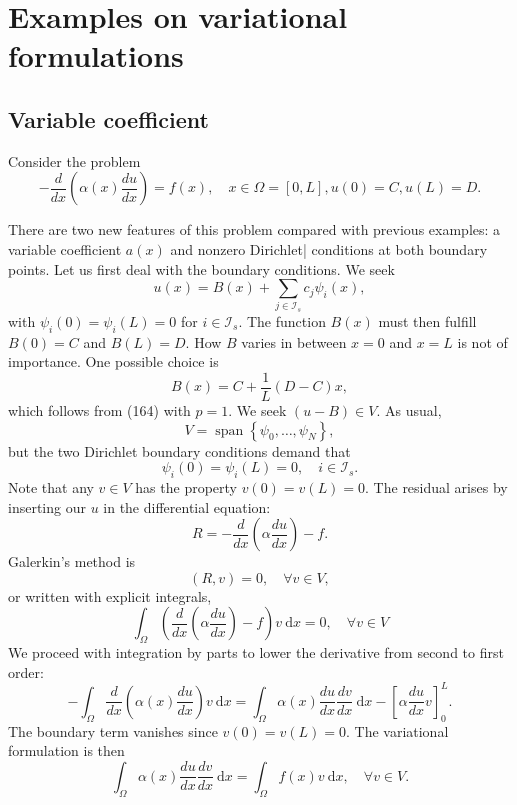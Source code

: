 \documentclass[../main.tex]{subfiles}
\begin{document}
\chapter{Examples on variational formulations}
\label{chap:chap_12}

\section[Variable coefficient]{Variable coefficient}
	\label{sec:sec_12_1}
		\noindent Consider the problem
		\begin{equation}
		\label{eqa166}
			-\frac{d}{d x}\left(\alpha(x) \frac{d u}{d x}\right)=f(x), \quad x \in \Omega=[0, L], u(0)=C, u(L)=D .
		\end{equation}
	
		\noindent There are two new features of this problem compared with previous examples: a variable coefficient $a(x)$ and nonzero Dirichlet| conditions at both boundary points.\smallbreak
		Let us first deal with the boundary conditions. We seek
		$$ u(x)=B(x)+\sum_{j \in \mathcal{I}_{s}} c_{j} \psi_{i}(x), $$
		with $\psi_{i}(0)=\psi_{i}(L)=0$ for $i \in \mathcal{I}_{s}$. The function $B(x)$ must then fulfill $B(0)=C$ and $B(L)=D$. How $B$ varies in between $x=0$ and $x=L$ is not of importance.\smallbreak
		\noindent One possible choice is
		$$ B(x)=C+\frac{1}{L}(D-C) x, $$
		which follows from (164) with $p=1$.\smallbreak
		We seek $(u-B) \in V$. As usual,
		$$ V=\operatorname{span}\left\{\psi_{0}, \ldots, \psi_{N}\right\}, $$
		but the two Dirichlet boundary conditions demand that
		$$ \psi_{i}(0)=\psi_{i}(L)=0, \quad i \in \mathcal{I}_{s} .$$
		Note that any $v \in V$ has the property $v(0)=v(L)=0$.\smallbreak
		The residual arises by inserting our $u$ in the differential equation:
		$$ R=-\frac{d}{d x}\left(\alpha \frac{d u}{d x}\right)-f .$$
		Galerkin's method is
		$$(R, v)=0, \quad \forall v \in V,$$
		or written with explicit integrals,
		$$\int_{\Omega}\left(\frac{d}{d x}\left(\alpha \frac{d u}{d x}\right)-f\right) v \mathrm{~d} x=0, \quad \forall v \in V$$
		We proceed with integration by parts to lower the derivative from second to first order:
		$$
		-\int_{\Omega} \frac{d}{d x}\left(\alpha(x) \frac{d u}{d x}\right) v \mathrm{~d} x=\int_{\Omega} \alpha(x) \frac{d u}{d x} \frac{d v}{d x} \mathrm{~d} x-\left[\alpha \frac{d u}{d x} v\right]_{0}^{L} .
		$$\smallbreak
		The boundary term vanishes since $v(0)=v(L)=0$. The variational formulation is then
		$$
		\int_{\Omega} \alpha(x) \frac{d u}{d x} \frac{d v}{d x} \mathrm{~d} x=\int_{\Omega} f(x) v \mathrm{~d} x, \quad \forall v \in V .
		$$
\end{document}
